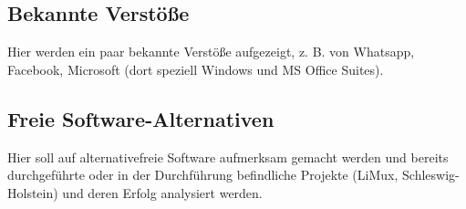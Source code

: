 \subsection{Bekannte Verstöße}
    Hier werden ein paar bekannte Verstöße aufgezeigt, z. B. von Whatsapp, Facebook, Microsoft (dort speziell Windows und MS Office Suites).

\subsection{Freie Software-Alternativen}
    Hier soll auf alternativefreie Software aufmerksam gemacht werden und bereits durchgeführte oder in der Durchführung befindliche Projekte (LiMux, Schleswig-Holstein) und deren Erfolg analysiert werden.
